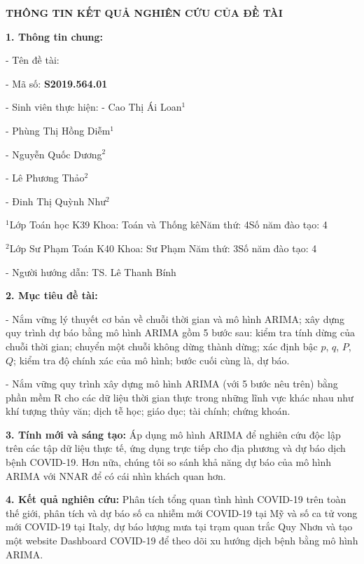 \newpage
\centerline{\bf THÔNG TIN KẾT QUẢ NGHIÊN CỨU CỦA ĐỀ TÀI}

\noindent 
{\bf 1. Thông tin chung:}

- Tên đề tài: 

- Mã số: \textbf{S2019.564.01}

- Sinh viên thực hiện: - Cao Thị Ái Loan$^{1}$
                       
            \hspace{4cm}- Phùng Thị Hồng Diễm$^{1}$
            
            \hspace{4cm}- Nguyễn Quốc Dương$^{2}$
                       
            \hspace{4cm}- Lê Phương Thảo$^{2}$
            
            \hspace{4cm}- Đinh Thị Quỳnh Như$^{2}$
            
$^1$Lớp Toán học K39 Khoa: Toán và Thống kê\quad Năm thứ: 4\quad Số năm đào tạo: 4

$^2$Lớp Sư Phạm Toán K40 \quad Khoa: Sư Phạm \quad Năm thứ: 3\quad Số năm đào tạo: 4

- Người hướng dẫn: TS. Lê Thanh Bính

\noindent 
{\bf 2. Mục tiêu đề tài:}

- Nắm vững lý thuyết cơ bản về chuỗi thời gian và mô hình ARIMA; xây dựng quy trình dự báo bằng mô hình ARIMA gồm 5 bước sau: kiểm tra tính dừng của chuỗi thời gian; chuyển một chuỗi không dừng thành dừng; xác định bậc $p$, $q$, $P$, $Q$; kiểm tra độ chính xác của mô hình; bước cuối cùng là, dự báo.

- Nắm vững quy trình xây dựng mô hình ARIMA (với 5 bước nêu trên) bằng phần mềm R cho các dữ liệu thời gian thực trong những lĩnh vực khác nhau như khí tượng thủy văn; dịch tễ học; giáo dục; tài chính; chứng khoán.

\noindent 
{\bf 3. Tính mới và sáng tạo:} Áp dụng mô hình ARIMA để nghiên cứu độc lập trên các tập dữ liệu thực tế, ứng dụng trực tiếp cho địa phương và dự báo dịch bệnh COVID-19. Hơn nữa, chúng tôi so sánh khả năng dự báo của mô hình ARIMA với NNAR để có cái nhìn khách quan hơn.

\noindent 
{\bf 4. Kết quả nghiên cứu:}
Phân tích tổng quan tình hình COVID-19 trên toàn thế giới, phân tích và dự báo số ca nhiễm mới COVID-19 tại Mỹ và số ca tử vong mới COVID-19 tại Italy, dự báo lượng mưa tại trạm quan trắc Quy Nhơn và tạo một website Dashboard COVID-19 để theo dõi xu hướng dịch bệnh bằng mô hình ARIMA.
 
